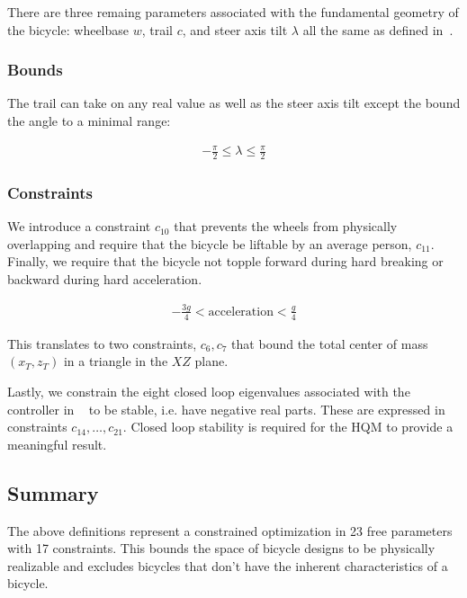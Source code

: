 \documentclass{bmd2019a}
\begin{document}
There are three remaing parameters associated with the fundamental geometry of
the bicycle: wheelbase $w$, trail $c$, and steer axis tilt $\lambda$ all the
same as defined in~\cite{Meijaard2007}.

\subsubsection{Bounds}

The trail can take on any real value as well as the steer axis tilt except the
bound the angle to a minimal range:

\begin{align}
  -\frac{\pi}{2} \leq \lambda \leq \frac{\pi}{2}
\end{align}


\subsubsection{Constraints}

We introduce a constraint $c_{10}$ that prevents the wheels from physically
overlapping and require that the bicycle be liftable by an average person,
$c_{11}$. Finally, we require that the bicycle not topple forward during hard
breaking or backward during hard acceleration.

\begin{align}
  -\frac{3g}{4} < \textrm{acceleration} < \frac{g}{4}
\end{align}

This translates to two constraints, $c_6,c_7$ that bound the total center of
mass $(x_T,z_T)$ in a triangle in the $XZ$ plane.

Lastly, we constrain the eight closed loop eigenvalues associated with the
controller in ~\cite{Hess2012} to be stable, i.e. have negative real parts.
These are expressed in constraints $c_{14},\ldots,c_{21}$. Closed loop
stability is required for the HQM to provide a meaningful result.

\subsection{Summary}

The above definitions represent a constrained optimization in 23 free
parameters with 17 constraints. This bounds the space of bicycle designs to be
physically realizable and excludes bicycles that don't have the inherent
characteristics of a bicycle.
\end{document}
